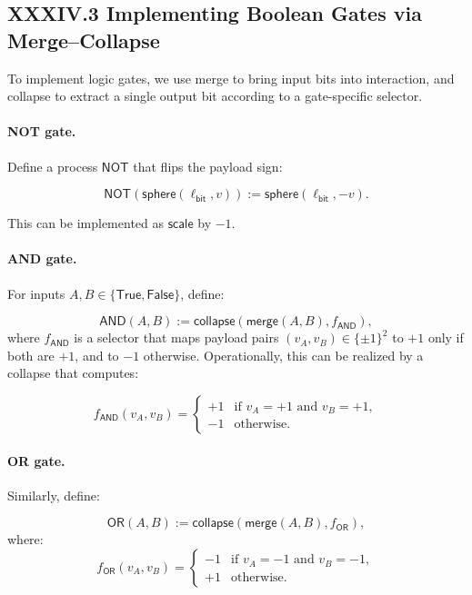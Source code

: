 \documentclass[12pt,letterpaper]{article}
\begin{document}
\subsection{XXXIV.3 Implementing Boolean Gates via Merge--Collapse}

To implement logic gates, we use merge to bring input bits into interaction, and collapse to extract a single output bit according to a gate-specific selector.

\paragraph{NOT gate.}
Define a process $\mathsf{NOT}$ that flips the payload sign:

\[
\mathsf{NOT}( \mathsf{sphere}(\ell_{\mathsf{bit}}, v)) 
:= \mathsf{sphere}(\ell_{\mathsf{bit}}, -v).
\]

This can be implemented as $\mathsf{scale}$ by $-1$.

\paragraph{AND gate.}
For inputs $A,B \in \{\mathsf{True}, \mathsf{False}\}$, define:

\[
\mathsf{AND}(A,B) :=
\mathsf{collapse}(\mathsf{merge}(A,B), f_{\mathsf{AND}}),
\]
where $f_{\mathsf{AND}}$ is a selector that maps payload pairs $(v_A, v_B) \in \{\pm1\}^2$ to $+1$ only if both are $+1$, and to $-1$ otherwise. Operationally, this can be realized by a collapse that computes:

\[
f_{\mathsf{AND}}(v_A, v_B) = 
\begin{cases}
+1 & \text{if } v_A = +1 \text{ and } v_B = +1,\\
-1 & \text{otherwise.}
\end{cases}
\]

\paragraph{OR gate.}
Similarly, define:

\[
\mathsf{OR}(A,B) :=
\mathsf{collapse}(\mathsf{merge}(A,B), f_{\mathsf{OR}}),
\]
where:
\[
f_{\mathsf{OR}}(v_A, v_B) =
\begin{cases}
-1 & \text{if } v_A = -1 \text{ and } v_B = -1,\\
+1 & \text{otherwise.}
\end{cases}
\]
\end{document}

